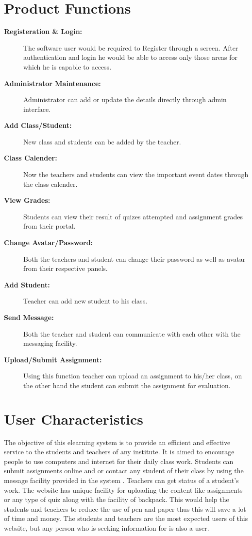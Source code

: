 \section{Product Functions}
\begin{description}
\item[\bf{Registeration \& Login}:]
The software user would be required to Register through a screen. After 
authentication and login he would be able to access only those areas 
for which he is capable to access.
\item[\bf{Administrator Maintenance}:]
Administrator can add or update the details directly through admin 
interface.
\item[\bf{Add Class/Student}:]
New class and students can be added by the teacher.
\item[\bf{Class Calender}:]
Now the teachers and students can view the important event dates through the class calender.
\item[\bf{View Grades}:]
Students can view their result of quizes attempted and assignment grades from their portal.
\item[\bf{Change Avatar/Password}:] 
Both the teachers and student can change their password as well as avatar from their respective panels.
\item[\bf{Add Student}:] 
Teacher can add new student to his class.
\item[\bf{Send Message}:] 
Both the teacher and student can communicate with each other with the messaging facility.
\item[\bf{Upload/Submit Assignment}:] 
Using this function teacher can upload an assignment to his/her class, on the other hand the student can submit the assignment for evaluation.
\end{description}

\section{User Characteristics}
The objective of this elearning system is to provide an efficient and effective service to the students and teachers of any institute. It is aimed to encourage people to use computers and internet for their daily class work. Students can submit assignments online and or contact any student of their class by using the message facility provided in the system . Teachers can get status of a student's work.
The website has unique facility for uploading the content like assignments or any type of quiz along with the facility of backpack. This would help the students and teachers to reduce the use of pen and paper thus this will save a lot of time and money.
The students and teachers are the most expected users of this website,
but any person who is seeking information for is also a user.

